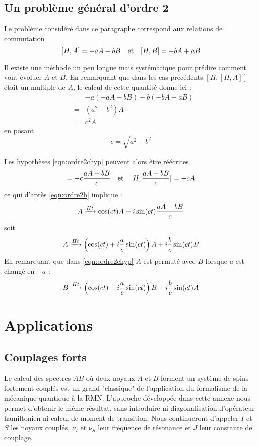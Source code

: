 \subsection{Un problème général d'ordre 2}
Le problème considéré dans ce paragraphe correspond aux relations de commutation
\begin{equation}
\label{eqn:ordre2chyp}
[H,A] = -aA -bB \quad \mbox{et} \quad [H,B] = -bA + aB
\end{equation}

Il existe une méthode un peu longue mais systématique pour prédire
comment vont évoluer $A$ et $B$.
En remarquant que dans les cas précédents $[H,[H,A]]$ était un multiple de $A$,
le calcul de cette quantité donne ici :
\begin{eqnarray}
[H,-aA-bB] & = & -a(-aA-bB) -b(-bA+aB) \\
& = & (a^2+b^2)A \\
& = & c^2 A
\end{eqnarray}
en posant
\begin{equation}
c = \sqrt{a^2+b^2}
\end{equation}

Les hypothèses \ref{eqn:ordre2chyp} peuvent alors être réécrites
\begin{equation}
[H,A] = -c\frac{aA+bB}{c} \qetq [H,\frac{aA+bB}{c}] = -cA
\end{equation}
ce qui d'après \ref{eqn:ordre2b} implique :
\begin{equation}
A \xrightarrow{Ht} \cos(ct)A + i\sin(ct)\frac{aA+bB}{c}
\end{equation}
soit
\begin{equation}
\label{eqn:ordre2ca}
A \xrightarrow{Ht} 
\left(\cos(ct)+i\frac{a}{c}\sin(ct)\right)A + i\frac{b}{c}\sin(ct)B
\end{equation}
En remarquant que dans \ref{eqn:ordre2chyp} $A$ est permuté avec $B$
lorsque $a$ est changé en $-a$ :
\begin{equation}
\label{eqn:ordre2cb}
B \xrightarrow{Ht} 
\left(\cos(ct)-i\frac{a}{c}\sin(ct)\right)B + i\frac{b}{c}\sin(ct)A
\end{equation}

\section{Applications}

\subsection{Couplages forts}
Le calcul des spectres $AB$ où deux noyaux $A$ et $B$ forment un système
de spins fortement couplés est un grand "classique" de l'application du formalisme de la
mécanique quantique à la RMN.
L'approche développée dans cette annexe nous permet d'obtenir le même
résultat, sans introduire ni diagonalisation d'opérateur hamiltonien
ni calcul de moment de transition.
Nous continueront d'appeler $I$ et $S$ les noyaux couplés, $\nu_I$ et $\nu_S$
leur fréquence de résonance et $J$ leur constante de couplage.

